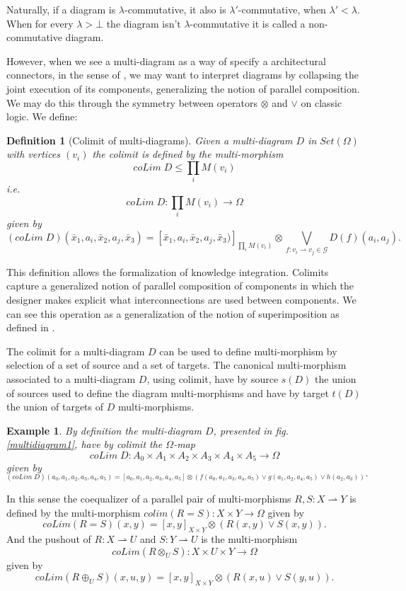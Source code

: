 \documentclass[oribibl]{llncs}
\newtheorem{defn}{Definition}
\newtheorem{exam}{Example}
\newcommand{\G}{\mathcal{G}}
\begin{document}
Naturally, if a diagram is $\lambda$-commutative, it also is $\lambda'$-commutative, when $\lambda'<\lambda$. When for every $\lambda>\bot$ the diagram isn't $\lambda$-commutative it is called a non-commutative diagram.

However, when we see a multi-diagram as a way of specify a architectural connectors, in the sense of \cite{Backhouse03}, we may want to interpret diagrams by collapsing the joint execution of its components, generalizing the notion of parallel composition.  We may do this through the symmetry between operators $\otimes$ and $\vee$ on classic logic. We define:

\begin{defn}[Colimit of multi-diagrams]\label{colim}
Given a multi-diagram $D$ in $Set(\Omega)$ with vertices $(v_i)$ the colimit is defined by the multi-morphism
\[
coLim\; D \leq \prod_i M(v_i)
\]
i.e.
 \[
coLim\; D: \prod_i M(v_i) \rightarrow \Omega
\]
given by
\[
(coLim\;D)(\bar{x}_1,a_{i},\bar{x}_2,a_{j},\bar{x}_3)=[\bar{x}_1,a_{i},\bar{x}_2,a_{j},\bar{x}_3)]_{\prod_iM(v_i)}\otimes\bigvee_{f:v_i\rightharpoonup v_j\in \G} D(f)(a_{i},a_{j}).
\]
\end{defn}
This definition allows the formalization of knowledge integration. Colimits capture a generalized notion of parallel composition of components in which the designer makes explicit what interconnections are used between components. We can see this operation as a generalization of the notion of superimposition as defined in \cite{Bosch99}.

The colimit for a multi-diagram  $D$ can be used to define multi-morphism by selection of a set of source and a set of targets. The canonical multi-morphism associated to a multi-diagram $D$, using colimit, have by source $s(D)$ the union of sources used to define the diagram multi-morphisms and have by target $t(D)$ the union of targets of $D$ multi-morphisms.

\begin{exam}
By definition the multi-diagram $D$, presented in fig. \ref{multidiagram1},
have by colimit the $\Omega$-map
\[
coLim\;D:A_0\times A_1\times A_2\times A_3\times A_4\times A_5\rightarrow \Omega
\]
given by
\[
_{(coLim\;D)(a_0,a_1,a_2,a_3,a_4,a_5)=[a_0,a_1,a_2,a_3,a_4,a_5]\otimes(f(a_0,a_1,a_3,a_4,a_5)\vee g(a_1,a_2,a_4,a_5)\vee h(a_2,a_3))}.
\]
\end{exam}

In this sense the coequalizer of a parallel pair of multi-morphisms $R,S:X\rightharpoonup Y$ is defined by the multi-morphism $colim(R=S):X\times Y \rightarrow \Omega$ given by
\[
coLim(R=S)(x,y)=[x,y]_{X\times Y}\otimes(R(x,y)\vee S(x,y)) .
\]
And the pushout of $R:X\rightharpoonup U$ and $S:Y\rightharpoonup U$ is the multi-morphism
\[coLim(R\otimes_U S):X\times U\times Y\rightarrow \Omega\] given by
\[
coLim(R\oplus_U S)(x,u,y)=[x,y]_{X\times Y}\otimes(R(x,u)\vee S(y,u)).
\]
\end{document}
